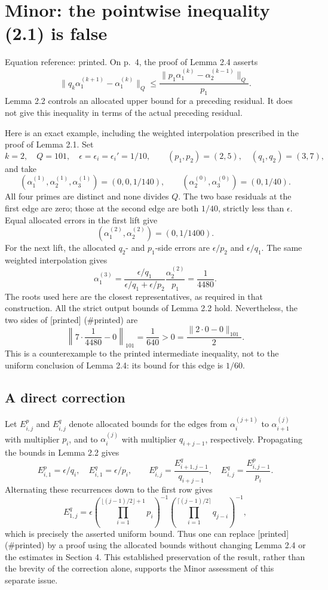 \documentclass[10pt]{article}
\begin{document}
\section*{Minor: the pointwise inequality (2.1) is false}
Equation reference: printed. On p. 4, the proof of Lemma 2.4 asserts \[
 \|q_k\alpha_1^{(k+1)}-\alpha_1^{(k)}\|_Q
 \le \frac{\|p_1\alpha_1^{(k)}-\alpha_2^{(k-1)}\|_Q}{p_1}.\] Lemma 2.2 controls an allocated upper bound for a preceding residual. It does not give this inequality in terms of the actual preceding residual.\par
Here is an exact example, including the weighted interpolation prescribed in the proof of Lemma 2.1. Set \[k=2,\quad Q=101,\quad \epsilon=\epsilon_i=\epsilon_i'=1/10,\qquad
 (p_1,p_2)=(2,5),\quad(q_1,q_2)=(3,7),\] and take \[(\alpha_1^{(1)},\alpha_2^{(1)},\alpha_3^{(1)})
      =(0,0,1/140),\qquad
 (\alpha_2^{(0)},\alpha_3^{(0)})=(0,1/40).\] All four primes are distinct and none divides \(Q\). The two base residuals at the first edge are zero; those at the second edge are both \(1/40\), strictly less than \(\epsilon\). Equal allocated errors in the first lift give \[(\alpha_1^{(2)},\alpha_2^{(2)})=(0,1/1400).\] For the next lift, the allocated \(q_2\)- and \(p_1\)-side errors are \(\epsilon/p_2\) and \(\epsilon/q_1\). The same weighted interpolation gives \[\alpha_1^{(3)}
 =\frac{\epsilon/q_1}{\epsilon/q_1+\epsilon/p_2}
       \frac{\alpha_2^{(2)}}{p_1}
 =\frac1{4480}.\] The roots used here are the closest representatives, as required in that construction. All the strict output bounds of Lemma 2.2 hold. Nevertheless, the two sides of [printed] (\#printed) are \[\left\|7\cdot\frac1{4480}-0\right\|_{101}
       =\frac1{640}>0
       =\frac{\|2\cdot0-0\|_{101}}2.\] This is a counterexample to the printed intermediate inequality, not to the uniform conclusion of Lemma 2.4: its bound for this edge is \(1/60\).\par
\subsection*{A direct correction}
Let \(E^p_{i,j}\) and \(E^q_{i,j}\) denote allocated bounds for the edges from \(\alpha_i^{(j+1)}\) to \(\alpha_{i+1}^{(j)}\) with multiplier \(p_i\), and to \(\alpha_i^{(j)}\) with multiplier \(q_{i+j-1}\), respectively. Propagating the bounds in Lemma 2.2 gives \[E^p_{i,1}=\epsilon/q_i,\quad E^q_{i,1}=\epsilon/p_i,\qquad
 E^p_{i,j}=\frac{E^q_{i+1,j-1}}{q_{i+j-1}},\quad
 E^q_{i,j}=\frac{E^p_{i,j-1}}{p_i}.\] Alternating these recurrences down to the first row gives \[E^q_{1,j}=
 \epsilon\left(\prod_{i=1}^{\lfloor(j-1)/2\rfloor+1}p_i\right)^{-1}
 \left(\prod_{i=1}^{\lceil(j-1)/2\rceil}q_{j-i}\right)^{-1},\] which is precisely the asserted uniform bound. Thus one can replace [printed] (\#printed) by a proof using the allocated bounds without changing Lemma 2.4 or the estimates in Section 4. This established preservation of the result, rather than the brevity of the correction alone, supports the Minor assessment of this separate issue.\par
\end{document}
